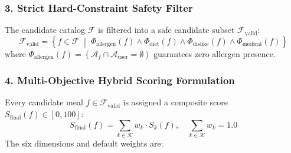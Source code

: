 \documentclass[12pt,a4paper]{report}
\begin{document}
\subsubsection{3. Strict Hard-Constraint Safety Filter}
The candidate catalog $\mathcal{F}$ is filtered into a safe candidate subset $\mathcal{F}_{\text{valid}}$:
\begin{equation}
\mathcal{F}_{\text{valid}} = \left\{ f \in \mathcal{F} \;\middle|\; \Phi_{\text{allergen}}(f) \land \Phi_{\text{diet}}(f) \land \Phi_{\text{dislike}}(f) \land \Phi_{\text{medical}}(f) \right\}
\end{equation}
where $\Phi_{\text{allergen}}(f) = (\mathcal{A}_f \cap \mathcal{A}_{\text{user}} = \emptyset)$ guarantees zero allergen presence.

\subsubsection{4. Multi-Objective Hybrid Scoring Formulation}
Every candidate meal $f \in \mathcal{F}_{\text{valid}}$ is assigned a composite score $S_{\text{final}}(f) \in [0, 100]$:
\begin{equation}
S_{\text{final}}(f) = \sum_{k \in \mathcal{K}} w_k \cdot S_k(f), \quad \sum_{k \in \mathcal{K}} w_k = 1.0
\end{equation}
The six dimensions and default weights are:
\end{document}
